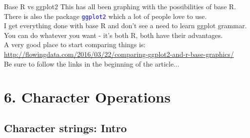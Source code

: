 \documentclass[xcolor=table,           xcolor=dvipsnames]{beamer}\usepackage[]{graphicx}\usepackage[]{color}
\newcommand{\rcode}[1]{\texttt{\textcolor{Blue}{#1}}} %
\begin{document}
\begin{frame}[fragile]{Base R vs ggplot2}
This has all been graphing with the possibilities of base R.\\
There is also the package \rcode{ggplot2} which a lot of people love to use.\\
I get everything done with base R and don't see a need to learn ggplot grammar.\\
You can do whatever you want - it's both R, both have their advantages.\\
A very good place to start comparing things is:\\
\url{http://flowingdata.com/2016/03/22/comparing-ggplot2-and-r-base-graphics/}\\
Be sure to follow the links in the beginning of the article...
\end{frame}

\section{6. Character Operations}

\subsection{Character strings: Intro}
\end{document}
